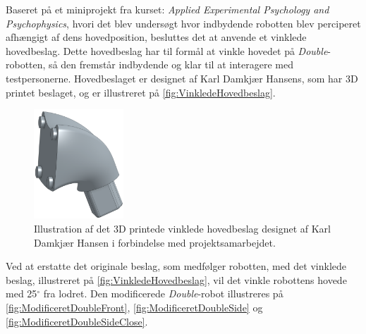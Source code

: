 Baseret på et miniprojekt fra kurset: \textit{Applied Experimental Psychology and Psychophysics}, hvori det blev undersøgt hvor indbydende robotten blev perciperet afhængigt af dens hovedposition, besluttes det at anvende et vinklede hovedbeslag. Dette hovedbeslag har til formål at vinkle hovedet på \textit{Double}-robotten, så den fremstår indbydende og klar til at interagere med testpersonerne. Hovedbeslaget er designet af Karl Damkjær Hansens, som har 3D printet beslaget, og er illustreret på \autoref{fig:VinkledeHovedbeslag}.            
%
\begin{figure}[H]
\centering
\includegraphics[width = 0.3\textwidth]{Figure/TestdesignParametre/VinkledeHovedbeslag} 
\caption{Illustration af det 3D printede vinklede hovedbeslag designet af Karl Damkjær Hansen i forbindelse med projektsamarbejdet.}
\label{fig:VinkledeHovedbeslag}
\end{figure}
\noindent
%
Ved at erstatte det originale beslag, som medfølger robotten, med det vinklede beslag, illustreret på \autoref{fig:VinkledeHovedbeslag}, vil det vinkle robottens hovede med 25$^{\circ}$ fra lodret. Den modificerede \textit{Double}-robot illustreres på \autoref{fig:ModificeretDoubleFront}, \autoref{fig:ModificeretDoubleSide} og \autoref{fig:ModificeretDoubleSideClose}.
%
